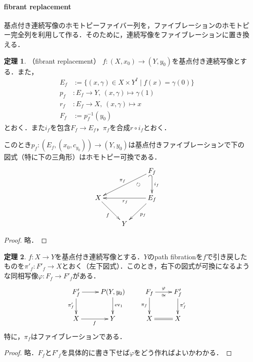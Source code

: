 \documentclass[a4paper,11pt]{jsarticle}
\theoremstyle{definition}
\newtheorem{thm}{定理}[section]
\begin{document}
\paragraph{fibrant replacement}
基点付き連続写像のホモトピーファイバー列を，ファイブレーションのホモトピー完全列を利用して作る．そのために，連続写像をファイブレーションに置き換える．
\begin{thm}（fibrant replacement）
  $f\colon (X,x_0)\to (Y,y_0)$を基点付き連続写像とする．また，\begin{align*}
    E_f&:=\{(x,\gamma)\in X\times Y^I\mid f(x)=\gamma(0)\}\\
    p_f&\colon E_f\to Y,\ (x,\gamma)\mapsto \gamma(1)\\
    r_f&\colon E_f\to X,\ (x,\gamma)\mapsto x\\
    F_f&:=p_f^{-1}(y_0)
  \end{align*}
  とおく．また$i_f$を包含$F_f\to E_f$，$\pi_f$を合成$r\circ i_f$とおく．
  
  このとき$p_f\colon (E_f,(x_0,c_{y_0}))\to(Y,y_0)$は基点付きファイブレーションで下の図式（特に下の三角形）はホモトピー可換である．
  \[\xymatrix{
    &&F_f\ar@{_(->}[d]^{i_f}\ar[lld]_{\pi_f}\\
    X\ar[dr]_f & \ar@{}[ur]|{\circlearrowright}&E_f\ar[ll]^{r_f} \ar[dl]^{p_f}\\
    &Y&
  }\]
\end{thm}
  \begin{proof}
    略．
  \end{proof}
  \begin{thm}$f\colon X\to Y$を基点付き連続写像とする．$Y$のpath fibrationを$f$で引き戻したものを$\pi'_f\colon F'_f\to X$とおく（左下図式）．このとき，右下の図式が可換になるような同相写像$\varphi\colon F_f\to F'_f$がある．
    \[
    \xymatrix{
      F'_f\ar[d]_{\pi'_f}\ar[r]&P(Y,y_0)\ar[d]^{\mathrm{ev}_1}&F_f\ar[r]^{\varphi}_{\cong}\ar[d]_{\pi_f}&F'_f\ar[d]^{\pi'_f}\\
      X\ar[r]_f&Y&X\ar@{=}[r]&X
    }  
    \]
    特に，$\pi_f$はファイブレーションである．
  \end{thm}
  \begin{proof}
    略．$F_f$と$F'_f$を具体的に書き下せば$\varphi$をどう作ればよいかわかる．
  \end{proof}
\end{document}
